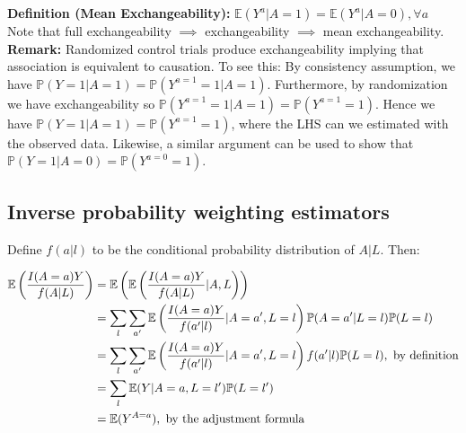 \documentclass[10pt]{article}
\newcommand{\E}{\mathbb{E}}
\newcommand{\pp}{\mathbb{P}}
\begin{document}
\noindent \textbf{Definition (Mean Exchangeability):} $\E (Y^a | A = 1) = \E(Y^a | A = 0), \forall a$\\

Note that full exchangeability $\implies$ exchangeability $\implies$ mean exchangeability. \\

\noindent \textbf{Remark:} Randomized control trials produce exchangeability implying that association is equivalent to causation. To see this: By consistency assumption, we have $\pp (Y = 1 | A = 1) = \pp(Y^{a=1} = 1 | A = 1)$. Furthermore, by randomization we have exchangeability so $\pp(Y^{a=1} = 1 | A = 1) = \pp(Y^{a=1} = 1)$. Hence we have $\pp (Y = 1 | A = 1) = \pp(Y^{a=1} = 1)$, where the LHS can we estimated with the observed data. Likewise, a similar argument can be used to show that $\pp (Y = 1 | A = 0) = \pp(Y^{a=0} = 1)$.

\subsection{Inverse probability weighting estimators}

Define $f(a | l)$ to be the conditional probability distribution of $A | L$. Then:

\begin{equation}
\begin{aligned}
\EE \left( \frac{ I(A=a) Y}{ f(A|L) } \right)  &= \EE \left( \EE \left( \frac{ I(A=a) Y}{ f(A|L) } | A,L \right) \right) \\
&= \sum_l \sum_{a'} \EE \left( \frac{ I(A=a) Y}{ f(a'|l) } | A = a', L = l \right) \pp (A = a' | L = l) \pp(L = l) \\
&= \sum_l \sum_{a'} \EE \left( \frac{ I(A=a) Y}{ f(a'|l) } | A = a', L = l \right) f(a' | l) \pp(L = l), \text{ by definition} \\
&= \sum_l \EE(Y| A=a, L = l' ) \pp(L = l') \\
&= \EE(Y^{A=a}), \text{ by the adjustment formula }
\end{aligned}
\end{equation}
\end{document}
